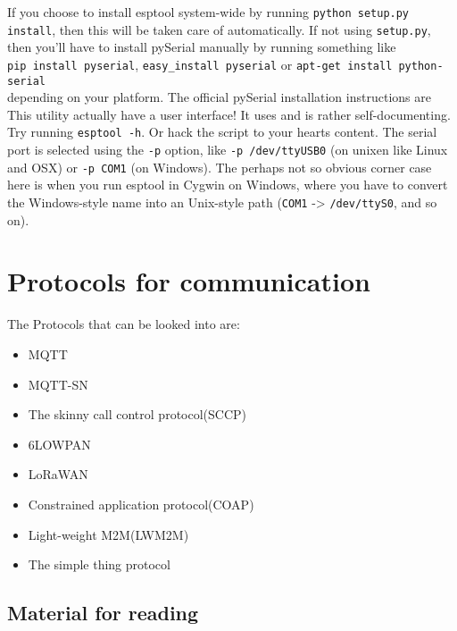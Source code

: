 \documentclass[16pt]{article}
\begin{document}
If you choose to install esptool system-wide by running
\texttt{python setup.py install}, then this will be taken care of
automatically.
If not using \texttt{setup.py}, then you'll have to install pySerial
manually by running something like \\

\texttt{pip install pyserial},
\texttt{easy\_install pyserial} or
\texttt{apt-get install python-serial} \\
\vspace{0.3cm}
depending on your platform. The
official pySerial installation instructions are
This utility actually have a user interface! It uses
and is rather self-documenting. Try running \texttt{esptool -h}. Or hack the
script to your hearts content. The serial port is selected using the
\texttt{-p} option, like \texttt{-p /dev/ttyUSB0} (on unixen like Linux
and OSX) or \texttt{-p COM1} (on Windows). The perhaps not so obvious
corner case here is when you run esptool in Cygwin on Windows, where you
have to convert the Windows-style name into an Unix-style path
(\texttt{COM1} -\textgreater{} \texttt{/dev/ttyS0}, and so on).

\vspace{9cm}


\section{Protocols for communication}

\vspace{0.5cm}

The Protocols that can be looked into are:

\begin{itemize}

\item
  MQTT
\item
  MQTT-SN
\item
  The skinny call control protocol(SCCP)
\item
  6LOWPAN
\item
  LoRaWAN
\item
  Constrained application protocol(COAP)
\item
  Light-weight M2M(LWM2M)
\item
  The simple thing protocol
\end{itemize}

\subsection{Material for reading}
\end{document}
